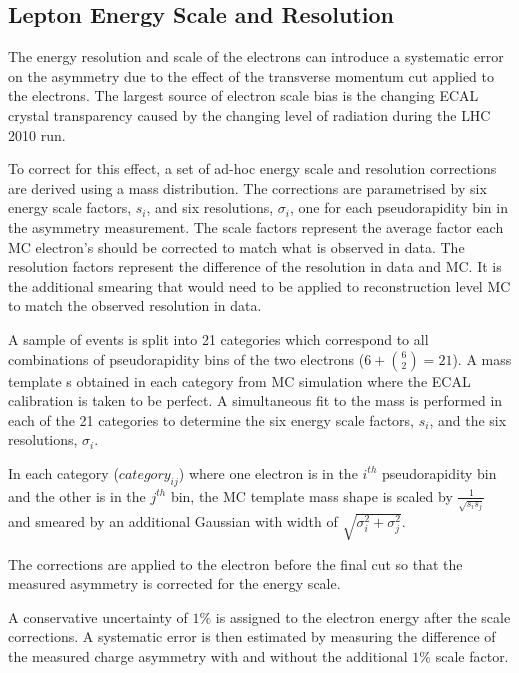 \subsection{Lepton Energy Scale and Resolution}

The energy resolution and scale of the electrons can introduce a systematic
error on the asymmetry due to the effect of the transverse momentum cut
applied to the electrons. The largest source of electron scale bias is the
changing ECAL crystal transparency caused by the changing level of radiation
during the \ac{LHC} 2010 run.

To correct for this effect, a set of ad-hoc energy scale and resolution corrections are
derived using a \Zee mass distribution. The corrections are parametrised by
six energy scale factors, $s_i$, and six resolutions, $\sigma_i$, one for each
pseudorapidity bin in the asymmetry measurement.
The scale factors represent the average factor each \ac{MC} electron's \Pt
should be corrected to match what is observed in data.
The resolution factors represent the difference of the resolution in data and
\ac{MC}. It is the additional smearing that would need to be applied to
reconstruction level \ac{MC} to match the observed resolution in data.

A sample of \Zee events is  split into 21 categories which correspond to all
combinations of pseudorapidity bins of the two electrons ($6+\binom{6}{2} =
21$).  A mass template s obtained in each category from \ac{MC} simulation where
the \ac{ECAL} calibration is taken to be perfect.
A simultaneous fit to the \Zee mass is performed in each of the 21 categories
to determine the six energy scale factors, $s_i$, and the six resolutions, 
$\sigma_i$.

In each category ($category_{ij}$) where one electron is in the $i^{th}$
pseudorapidity bin and the other is in the $j^{th}$ bin, the \ac{MC} template
mass shape is scaled by $\frac{1}{\sqrt{s_i s_j} } $
and smeared by an additional Gaussian with width of
$\sqrt{\sigma_i^2+\sigma_j^2}$.

The corrections are applied to the electron before the final \Pt cut so that
the measured asymmetry is corrected for the energy scale.

A conservative uncertainty of $1\%$ is assigned to the electron energy
after the scale corrections. A systematic error is then estimated by measuring
the difference of the measured charge asymmetry with and without the additional
$1\%$ scale factor.

